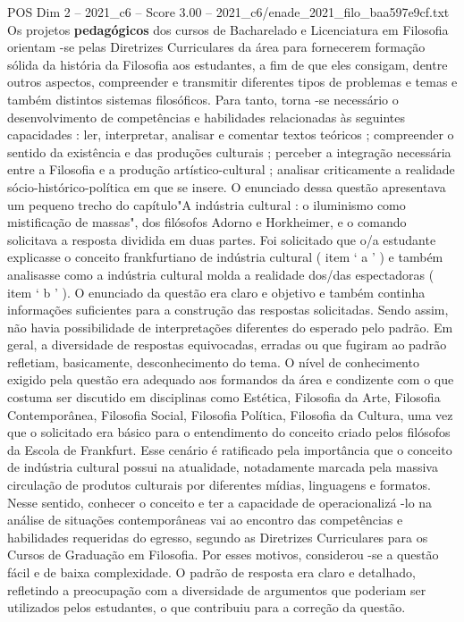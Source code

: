 \begin{textsample}{POS Dim 2 – 2021\_c6 – Score 3.00 – 2021\_c6/enade\_2021\_filo\_baa597e9cf.txt}
Os projetos \textbf{pedagógicos} dos cursos de Bacharelado e Licenciatura em Filosofia orientam -se pelas Diretrizes Curriculares da área para fornecerem formação sólida da história da Filosofia aos estudantes, a fim de que eles consigam, dentre outros aspectos, compreender e transmitir diferentes tipos de problemas e temas e também distintos sistemas filosóficos.
Para tanto, torna -se necessário o desenvolvimento de competências e habilidades relacionadas às seguintes capacidades : ler, interpretar, analisar e comentar textos teóricos ; compreender o sentido da existência e das produções culturais ; perceber a integração necessária entre a Filosofia e a produção artístico-cultural ; analisar criticamente a realidade sócio-histórico-política em que se insere.
O enunciado dessa questão apresentava um pequeno trecho do capítulo"A indústria cultural : o iluminismo como mistificação de massas", dos filósofos Adorno e Horkheimer, e o comando solicitava a resposta dividida em duas partes.
Foi solicitado que o/a estudante explicasse o conceito frankfurtiano de indústria cultural ( item ‘ a ’ ) e também analisasse como a indústria cultural molda a realidade dos/das espectadoras ( item ‘ b ’ ).
O enunciado da questão era claro e objetivo e também continha informações suficientes para a construção das respostas solicitadas.
Sendo assim, não havia possibilidade de interpretações diferentes do esperado pelo padrão.
Em geral, a diversidade de respostas equivocadas, erradas ou que fugiram ao padrão refletiam, basicamente, desconhecimento do tema.
O nível de conhecimento exigido pela questão era adequado aos formandos da área e condizente com o que costuma ser discutido em disciplinas como Estética, Filosofia da Arte, Filosofia Contemporânea, Filosofia Social, Filosofia Política, Filosofia da Cultura, uma vez que o solicitado era básico para o entendimento do conceito criado pelos filósofos da Escola de Frankfurt.
Esse cenário é ratificado pela importância que o conceito de indústria cultural possui na atualidade, notadamente marcada pela massiva circulação de produtos culturais por diferentes mídias, linguagens e formatos.
Nesse sentido, conhecer o conceito e ter a capacidade de operacionalizá -lo na análise de situações contemporâneas vai ao encontro das competências e habilidades requeridas do egresso, segundo as Diretrizes Curriculares para os Cursos de Graduação em Filosofia.
Por esses motivos, considerou -se a questão fácil e de baixa complexidade.
O padrão de resposta era claro e detalhado, refletindo a preocupação com a diversidade de argumentos que poderiam ser utilizados pelos estudantes, o que contribuiu para a correção da questão.

\end{textsample}
